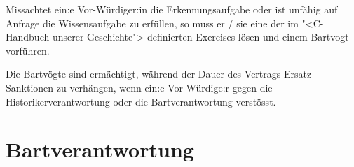 \documentclass[fontsize=12pt,parskip=half]{scrartcl}
\begin{document}
\begin{contract}
  \Clause[title={Sanktionen}]\label{H.sanktionen}
  Missachtet ein:e Vor-Würdiger:in die Erkennungsaufgabe  oder ist unfähig auf Anfrage die Wissensaufgabe  zu erfüllen,
  so muss er / sie eine der im "<C-Handbuch unserer Geschichte"> definierten Exercises lösen und einem Bartvogt vorführen.

  Die Bartvögte sind ermächtigt, während der Dauer des Vertrags Ersatz-Sanktionen zu verhängen, wenn ein:e Vor-Würdige:r gegen die Historikerverantwortung 
  oder die Bartverantwortung  verstösst.

\end{contract}

\pagebreak
\section{Bartverantwortung}
\end{document}
